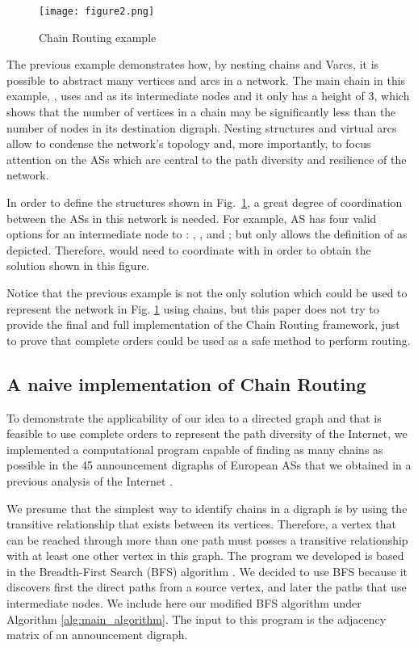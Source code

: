 \documentclass[5p,twocolumn]{elsarticle}
\begin{document}
\begin{figure}[!t]
	\centering
	\texttt{[image: figure2.png]}
	\caption{Chain Routing example}
	\label{fig:AlgorithmExample}
\end{figure}



The previous example demonstrates how, by nesting chains and Varcs, it is possible to abstract many vertices and arcs in a network. The main chain in this example, , uses  and  as its intermediate nodes and it only has a height of 3, which shows that the number of vertices in a chain may be significantly less than the number of nodes in its destination digraph. Nesting structures and virtual arcs allow to condense the network's topology and, more importantly, to focus attention on the ASs which are central to the path diversity and resilience of the network.

In order to define the structures shown in Fig.\ \ref{fig:AlgorithmExample}, a great degree of coordination between the ASs in this network is needed. For example, AS  has four valid options for an intermediate node to : , ,  and ; but only  allows the definition of  as depicted. Therefore,  would need to coordinate with  in order to obtain the solution shown in this figure.

Notice that the previous example is not the only solution which could be used to represent the network in Fig. \ref{fig:AlgorithmExample} using chains, but this paper does not try to provide the final and full implementation of the Chain Routing framework, just to prove that complete orders could be used as a safe method to perform routing.


\subsection{A naive implementation of Chain Routing}\label{experiment}

To demonstrate the applicability of our idea to a directed graph and that is feasible to use complete orders to represent the path diversity of the Internet, we implemented a computational program capable of finding as many chains as possible in the 45 announcement digraphs of European ASs that we obtained in a previous analysis of the Internet \cite{Arjona-Villicana2010, Arjona-Villicana2009}.

We presume that the simplest way to identify chains in a digraph is by using the transitive relationship that exists between its vertices. Therefore, a vertex that can be reached through more than one path must posses a transitive relationship with at least one other vertex in this graph. The program we developed is based in the Breadth-First Search (BFS) algorithm \cite{Bang-Jensen2002}. We decided to use BFS because it discovers first the direct paths from a source vertex, and later the paths that use intermediate nodes. We include here our modified BFS algorithm under Algorithm \ref{alg:main_algorithm}. The input to this program is the adjacency matrix of an announcement digraph.
\end{document}
